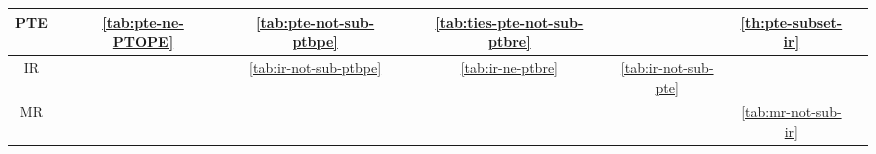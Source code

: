 \begin{sidewaystable}
\begin{tabular}{|c|c|c|c|c|c|c|c|c|c|}
		\hline
		PTE & \cellcolor{red!15} & \cellcolor{red!30} \autoref{tab:pte-ne-PTOPE} & \cellcolor{red!15} & \cellcolor{red!30} \autoref{tab:pte-not-sub-ptbpe} & \cellcolor{red!15} & \cellcolor{red!30} \autoref{tab:ties-pte-not-sub-ptbre} & \cellcolor{gray!30} & \cellcolor{green!30} \autoref{th:pte-subset-ir} & \cellcolor{red!15} \\
		\hline
		IR & \cellcolor{red!15} & \cellcolor{red!15} & \cellcolor{red!15} & \cellcolor{red!30} \autoref{tab:ir-not-sub-ptbpe} & \cellcolor{red!15} & \cellcolor{red!30} \autoref{tab:ir-ne-ptbre} & \cellcolor{red!30} \autoref{tab:ir-not-sub-pte} & \cellcolor{gray!30} & \cellcolor{red!15} \\
		\hline
		MR & \cellcolor{red!15} & \cellcolor{red!15} & \cellcolor{red!15} & \cellcolor{red!15} & \cellcolor{red!15} & \cellcolor{red!15} & \cellcolor{red!15} & \cellcolor{red!30} \autoref{tab:mr-not-sub-ir} & \cellcolor{gray!30} \\
		\hline
		\end{tabular}
\end{sidewaystable}

